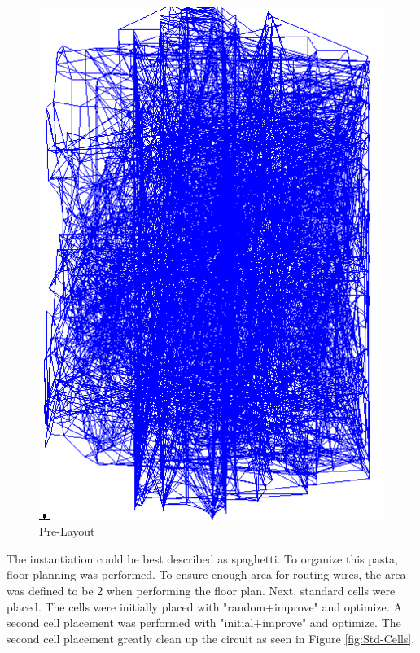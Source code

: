 \documentclass[11pt]{article}
\begin{document}
		\begin{figure}[H] 
			\centering 
			\includegraphics[width=\textwidth,height=\dimexpr\textheight-4\baselineskip-\abovecaptionskip-\belowcaptionskip\relax,keepaspectratio]{"Pictures/Pre-Layout"}
			\caption{Pre-Layout} 
			\label{fig:Pre-Layout} 
		\end{figure}
	
		The instantiation could be best described as spaghetti. To organize this pasta, floor-planning was performed. To ensure enough area for routing wires, the area was defined to be 2 when performing the floor plan. Next, standard cells were placed. The cells were initially placed with "random+improve" and optimize. A second cell placement was performed with "initial+improve" and optimize. The second cell placement greatly clean up the circuit as seen in Figure \ref{fig:Std-Cells}.
	
\end{document}
